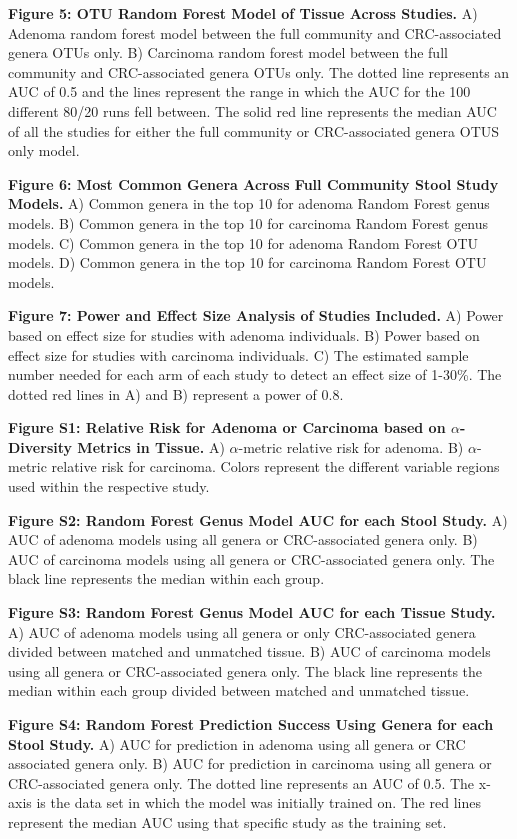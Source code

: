 \documentclass[12pt,]{article}
\begin{document}
\textbf{Figure 5: OTU Random Forest Model of Tissue Across Studies.} A)
Adenoma random forest model between the full community and
CRC-associated genera OTUs only. B) Carcinoma random forest model
between the full community and CRC-associated genera OTUs only. The
dotted line represents an AUC of 0.5 and the lines represent the range
in which the AUC for the 100 different 80/20 runs fell between. The
solid red line represents the median AUC of all the studies for either
the full community or CRC-associated genera OTUS only model.

\textbf{Figure 6: Most Common Genera Across Full Community Stool Study
Models.} A) Common genera in the top 10 for adenoma Random Forest genus
models. B) Common genera in the top 10 for carcinoma Random Forest genus
models. C) Common genera in the top 10 for adenoma Random Forest OTU
models. D) Common genera in the top 10 for carcinoma Random Forest OTU
models.

\textbf{Figure 7: Power and Effect Size Analysis of Studies Included.}
A) Power based on effect size for studies with adenoma individuals. B)
Power based on effect size for studies with carcinoma individuals. C)
The estimated sample number needed for each arm of each study to detect
an effect size of 1-30\%. The dotted red lines in A) and B) represent a
power of 0.8.

\newpage

\textbf{Figure S1: Relative Risk for Adenoma or Carcinoma based on
\(\alpha\)-Diversity Metrics in Tissue.} A) \(\alpha\)-metric relative
risk for adenoma. B) \(\alpha\)-metric relative risk for carcinoma.
Colors represent the different variable regions used within the
respective study.

\textbf{Figure S2: Random Forest Genus Model AUC for each Stool Study.}
A) AUC of adenoma models using all genera or CRC-associated genera only.
B) AUC of carcinoma models using all genera or CRC-associated genera
only. The black line represents the median within each group.

\textbf{Figure S3: Random Forest Genus Model AUC for each Tissue Study.}
A) AUC of adenoma models using all genera or only CRC-associated genera
divided between matched and unmatched tissue. B) AUC of carcinoma models
using all genera or CRC-associated genera only. The black line
represents the median within each group divided between matched and
unmatched tissue.

\textbf{Figure S4: Random Forest Prediction Success Using Genera for
each Stool Study.} A) AUC for prediction in adenoma using all genera or
CRC associated genera only. B) AUC for prediction in carcinoma using all
genera or CRC-associated genera only. The dotted line represents an AUC
of 0.5. The x-axis is the data set in which the model was initially
trained on. The red lines represent the median AUC using that specific
study as the training set.
\end{document}
